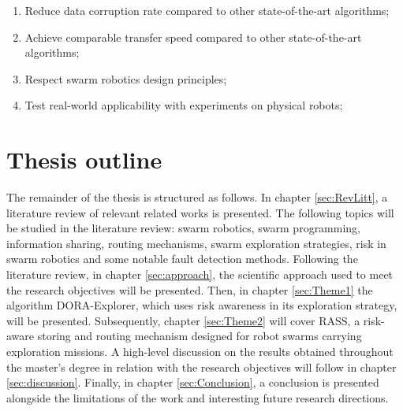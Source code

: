 \begin{enumerate}
    \item Reduce data corruption rate compared to other state-of-the-art algorithms;
    \item Achieve comparable transfer speed compared to other state-of-the-art algorithms;
    \item Respect swarm robotics design principles;
    \item Test real-world applicability with experiments on physical robots;
\end{enumerate}


\section{Thesis outline}
The remainder of the thesis is structured as follows. In chapter \ref{sec:RevLitt}, a literature review of relevant related works is presented. The following topics will be studied in the literature review: swarm robotics, swarm programming, information sharing, routing mechanisms, swarm exploration strategies, risk in swarm robotics and some notable fault detection methods. Following the literature review, in chapter \ref{sec:approach}, the scientific approach used to meet the research objectives will be presented. Then, in chapter \ref{sec:Theme1} the algorithm DORA-Explorer, which uses risk awareness in its exploration strategy, will be presented. Subsequently, chapter \ref{sec:Theme2} will cover RASS, a risk-aware storing and routing mechanism designed for robot swarms carrying exploration missions. A high-level discussion on the results obtained throughout the master's degree in relation with the research objectives will follow in chapter \ref{sec:discussion}. Finally, in chapter \ref{sec:Conclusion}, a conclusion is presented alongside the limitations of the work and interesting future research directions.
